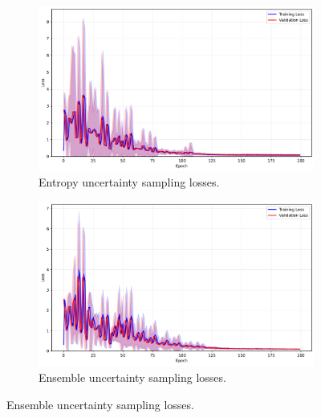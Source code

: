 \documentclass[10pt, conference]{IEEEtran}
\begin{document}
\begin{figure}[!t]
	\begin{subfigure}{\linewidth}
		\centering
		\includegraphics[width=\linewidth]{../results/housing/us_losses.pdf}
		\caption{Entropy uncertainty sampling losses.}
		\label{fig:us_losses_housing}
	\end{subfigure}
	
	\vspace{0.1em}
	
	\begin{subfigure}{\linewidth}
		\centering
		\includegraphics[width=\linewidth]{../results/housing/ensemble_us_losses.pdf}
		\caption{Ensemble uncertainty sampling losses.}
		\label{fig:ensemble_us_losses_housing}
	\end{subfigure}
\end{figure}
\end{document}
